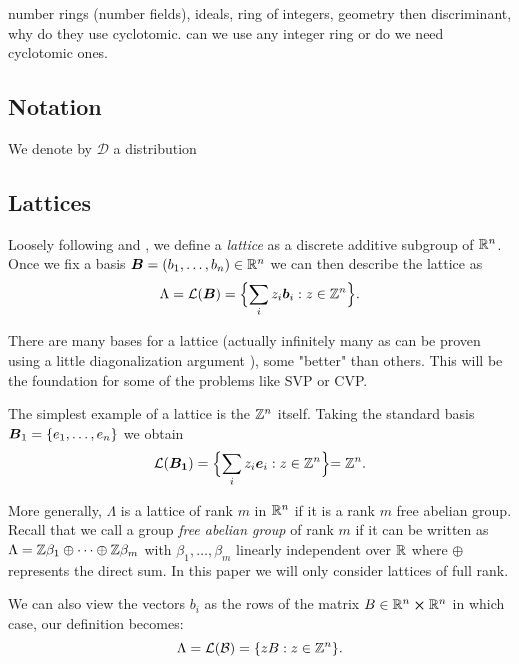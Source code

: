 number rings (number fields), ideals, ring of integers, geometry then discriminant, why do they use cyclotomic. can we use any integer ring or do we need cyclotomic ones.

\subsection{Notation}
We denote by $\mathcal{D}$ a distribution
\subsection{Lattices}

Loosely following \cite{ring-lwe} and \cite{conrad}, we define a \textit{lattice} as a discrete additive subgroup of $\mathbb{R}^n$. Once we fix a basis $\boldsymbol{B} = (b_1, \dots ,b_n) \in \mathbb{R}^n$ we can then describe the lattice as
$$ \Lambda = \mathcal{L}(\boldsymbol{B}) = \Bigl\{ \sum_i z_i \boldsymbol{b}_i : z \in \mathbb{Z}^n \Bigl\}.$$

There are many bases for a lattice (actually infinitely many as can be proven using a little diagonalization argument ), some "better" than others. This will be the foundation for some of the problems like SVP or CVP.

\begin{example}
    The simplest example of a lattice is the $\mathbb{Z}^n$ itself. Taking the standard basis $\boldsymbol{B}_1 = \{e_1, \dots, e_n\}$ we obtain
    $$\mathcal{L}(\boldsymbol{B_1}) = \Bigl\{ \sum_i z_i \boldsymbol{e}_i : z \in \mathbb{Z}^n \Bigl\} = \mathbb{Z}^n.$$
\end{example}
More generally, $\Lambda$ is a lattice of rank $m$ in $\mathbb{R}^n$ if it is a rank $m$ free abelian group. Recall that we call a group \textit{free abelian group} of rank $m$ if it can be written as $\Lambda = \mathbb{Z}\beta_1 \oplus \cdots \oplus\mathbb{Z}\beta_m$ with $\beta_1, \dots, \beta_m$ linearly independent over $\mathbb{R}$ where $\oplus$ represents the direct sum. In this paper we will only consider lattices of full rank. 

\begin{remark}
    We can also view the vectors $b_i$ as the rows of the matrix $B \in \mathbb{R}^n \cross \mathbb{R}^n$ in which case, our definition becomes:
    $$\Lambda = \mathcal{L(B)} = \{zB :  z \in \mathbb{Z}^n \}.$$
\end{remark}

